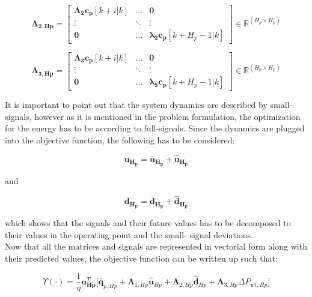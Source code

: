 \begin{equation}
\bm{\Lambda_{2,Hp}} =
 \begin{bmatrix}
 \bm{\Lambda_2} \bm{c_p}[k+i|k] & \hdots & \bm{0} \\
 \vdots & \ddots & \vdots\\
 \bm{0} & \hdots & \bm{\lambda_2 c_p}[k+H_p-1|k] 
 \end{bmatrix}
 \in \pmb{\mathbb{R}}^{(H_p \times H_p)}
\end{equation} 


\begin{equation}
\bm{\Lambda_{3,Hp}} =
 \begin{bmatrix}
 \bm{\Lambda_3} \bm{c_p}[k+i|k] & \hdots & \bm{0} \\
 \vdots & \ddots & \vdots\\
 \bm{0} & \hdots & \bm{\lambda_3 c_p}[k+H_p-1|k] 
 \end{bmatrix}
 \in \pmb{\mathbb{R}}^{(H_p \times H_p)}
\end{equation} 

It is important to point out that the system dynamics are described by small-signals, however as it is mentioned in the problem formulation, the optimization for the energy has to be according to full-signals. Since the dynamics are plugged into the objective function, the following has to be considered: 

\begin{equation}
\bm{u_{H_{p}}} = \bm{\bar{u}_{H_{p}}} + \bm{\hat{u}_{H_{p}}}
\label{u_pred}
\end{equation}

and

\begin{equation}
\bm{d_{H_{p}}} = \bm{\bar{d}_{H_{p}}} + \bm{\hat{d}_{H_{p}}}
\end{equation}

which shows that the signals and their future values has to be decomposed to their values in the operating point and the small- signal deviations. 
\\
Now that all the matrices and signals are represented in vectorial form along with their predicted values, the objective function can be written up such that:

\begin{equation}
  \Upsilon(\cdot) = \frac{1}{\eta} {\bm{{u}}}_{\bm{{Hp}}}^{T}\bigg[ {\bm{\bar{q}}}_{p,Hp} + {\bm{\Lambda}}_{1,Hp} {\bm{\hat{u}}}_{Hp} + {\bm{\Lambda}}_{2,Hp} {\bm{\hat{d}}}_{Hp} 
  + {\bm{\Lambda}}_{3,Hp} \Delta P_{wt,Hp} \bigg]
 \label{obj_hp}
\end{equation}

